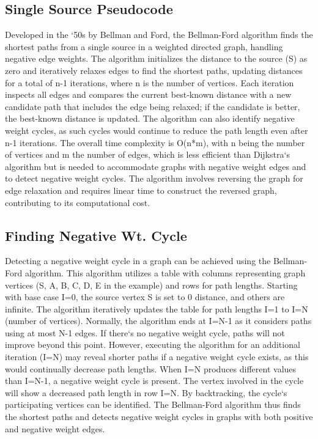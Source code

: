 \subsection*{Single Source  Pseudocode}
Developed in the `50s by Bellman and Ford, the Bellman-Ford algorithm finds the shortest paths from a single source in a weighted directed graph, handling negative edge weights.
The algorithm initializes the distance to the source (S) as zero and iteratively relaxes edges to find the shortest paths, updating distances for a total of n-1 iterations, where n is the number of vertices.
Each iteration inspects all edges and compares the current best-known distance with a new candidate path that includes the edge being relaxed; if the candidate is better, the best-known distance is updated.
The algorithm can also identify negative weight cycles, as such cycles would continue to reduce the path length even after n-1 iterations.
The overall time complexity is O(n*m), with n being the number of vertices and m the number of edges, which is less efficient than Dijkstra`s algorithm but is needed to accommodate graphs with negative weight edges and to detect negative weight cycles.
The algorithm involves reversing the graph for edge relaxation and requires linear time to construct the reversed graph, contributing to its computational cost.

\subsection*{Finding Negative Wt.
Cycle}
Detecting a negative weight cycle in a graph can be achieved using the Bellman-Ford algorithm.
This algorithm utilizes a table with columns representing graph vertices (S, A, B, C, D, E in the example) and rows for path lengths.
Starting with base case I=0, the source vertex S is set to 0 distance, and others are infinite.
The algorithm iteratively updates the table for path lengths I=1 to I=N (number of vertices).
Normally, the algorithm ends at I=N-1 as it considers paths using at most N-1 edges.
If there`s no negative weight cycle, paths will not improve beyond this point.
However, executing the algorithm for an additional iteration (I=N) may reveal shorter paths if a negative weight cycle exists, as this would continually decrease path lengths.
When I=N produces different values than I=N-1, a negative weight cycle is present.
The vertex involved in the cycle will show a decreased path length in row I=N\@.
By backtracking, the cycle`s participating vertices can be identified.
The Bellman-Ford algorithm thus finds the shortest paths and detects negative weight cycles in graphs with both positive and negative weight edges.

